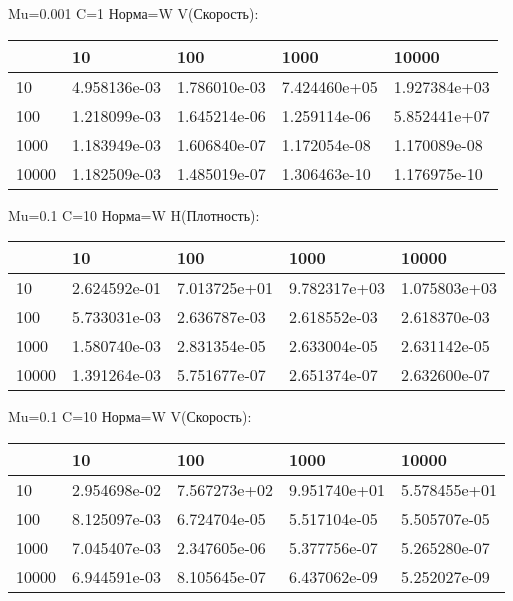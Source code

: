 \documentclass[a4paper, 12pt]{article}
\begin{document}
\bigskip
\bigskip
\bigskip


Mu=0.001  C=1 Норма=W V(Скорость):


\begin{tabular}{lllll}
\toprule
{} &         10    &         100   &         1000  &         10000 \\
\midrule
10    &  4.958136e-03 &  1.786010e-03 &  7.424460e+05 &  1.927384e+03 \\
100   &  1.218099e-03 &  1.645214e-06 &  1.259114e-06 &  5.852441e+07 \\
1000  &  1.183949e-03 &  1.606840e-07 &  1.172054e-08 &  1.170089e-08 \\
10000 &  1.182509e-03 &  1.485019e-07 &  1.306463e-10 &  1.176975e-10 \\
\bottomrule
\end{tabular}



\bigskip
\bigskip
\bigskip


Mu=0.1  C=10 Норма=W H(Плотность):


\begin{tabular}{lllll}
\toprule
{} &         10    &         100   &         1000  &         10000 \\
\midrule
10    &  2.624592e-01 &  7.013725e+01 &  9.782317e+03 &  1.075803e+03 \\
100   &  5.733031e-03 &  2.636787e-03 &  2.618552e-03 &  2.618370e-03 \\
1000  &  1.580740e-03 &  2.831354e-05 &  2.633004e-05 &  2.631142e-05 \\
10000 &  1.391264e-03 &  5.751677e-07 &  2.651374e-07 &  2.632600e-07 \\
\bottomrule
\end{tabular}



\bigskip
\bigskip
\bigskip


Mu=0.1  C=10 Норма=W V(Скорость):


\begin{tabular}{lllll}
\toprule
{} &         10    &         100   &         1000  &         10000 \\
\midrule
10    &  2.954698e-02 &  7.567273e+02 &  9.951740e+01 &  5.578455e+01 \\
100   &  8.125097e-03 &  6.724704e-05 &  5.517104e-05 &  5.505707e-05 \\
1000  &  7.045407e-03 &  2.347605e-06 &  5.377756e-07 &  5.265280e-07 \\
10000 &  6.944591e-03 &  8.105645e-07 &  6.437062e-09 &  5.252027e-09 \\
\bottomrule
\end{tabular}
\end{document}
